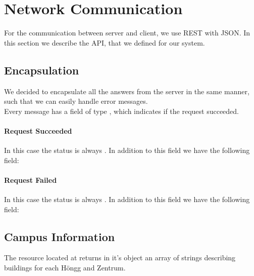 \section{Network Communication}
For the communication between server and client, we use REST with JSON. In this section we describe the API, that we defined for our system.

\subsection{Encapsulation}
We decided to encapsulate all the answers from the server in the same manner, such that we can easily handle error messages.\\
Every message has a field  of type , which indicates if the request succeeded.

\paragraph{Request Succeeded}
In this case the status is always . In addition to this field we have the following field:
\begin{description}
\end{description}

\paragraph{Request Failed}
In this case the status is always . In addition to this field we have the following field:
\begin{description}
\end{description}

\subsection{Campus Information}
The resource located at  returns in it's  object an array of strings describing buildings for each Höngg and Zentrum.
\begin{description}
\end{description}

